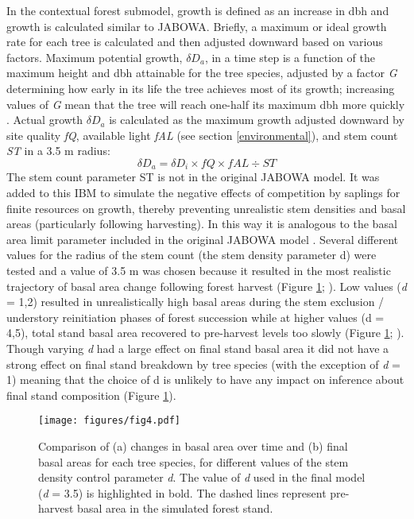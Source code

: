 \documentclass[
11pt, %
a4paper, %
oneside, %
headinclude,footinclude, %
]{scrartcl}
\begin{document}
In the contextual forest submodel, growth is defined as an increase in dbh and growth is calculated similar to JABOWA. Briefly, a maximum or ideal growth rate for each tree is calculated and then adjusted downward based on various factors. Maximum potential growth, $\delta D_a$, in a time step is a function of the maximum height and dbh attainable for the tree species, adjusted by a factor \textit{G} determining how early in its life the tree achieves most of its growth; increasing values of \textit{G} mean that the tree will reach one-half its maximum dbh more quickly \citep{Botkin1993}. Actual growth $\delta D_a$ is calculated as the maximum growth adjusted downward by site quality \textit{fQ}, available light \textit{fAL} (see section \ref{environmental}), and stem count \textit{ST} in a 3.5 m radius:
\begin{equation}
\delta D_a = \delta D_i \times fQ \times fAL \div ST
\end{equation}
The stem count parameter ST is not in the original JABOWA model. It was added to this IBM to simulate the negative effects of competition by saplings for finite resources on growth, thereby preventing unrealistic stem densities and basal areas (particularly following harvesting). In this way it is analogous to the basal area limit parameter included in the original JABOWA model \citep{Botkin1993}. Several different values for the radius of the stem count (the stem density parameter d) were tested and a value of 3.5 m was chosen because it resulted in the most realistic trajectory of basal area change following forest harvest (Figure \ref{fig:4}; \citep{Oliver1996}). Low values (\textit{d} = 1,2) resulted in unrealistically high basal areas during the stem exclusion / understory reinitiation phases of forest succession while at higher values (d = 4,5), total stand basal area recovered to pre-harvest levels too slowly (Figure \ref{fig:4}; \citep{Oliver1996}). Though varying \textit{d} had a large effect on final stand basal area it did not have a strong effect on final stand breakdown by tree species (with the exception of \textit{d} = 1) meaning that the choice of d is unlikely to have any impact on inference about final stand composition (Figure \ref{fig:4}).

\begin{figure}
	\centering
	\texttt{[image: figures/fig4.pdf]}
	\caption{Comparison of (a) changes in basal area over time and (b) final basal areas for each tree species, for different values of the stem density control parameter \textit{d}. The value of \textit{d} used in the final model (\textit{d} = 3.5) is highlighted in bold. The dashed lines represent pre-harvest basal area in the simulated forest stand.}
	\label{fig:4}
\end{figure}
\end{document}
